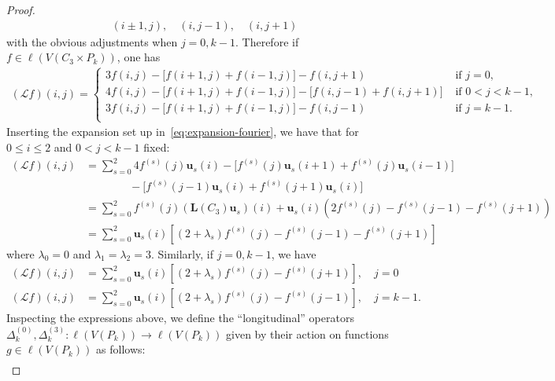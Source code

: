 \documentclass[11pt,a4paper]{amsart}
\begin{document}
\begin{proof}
        \begin{align*}
            (i\pm 1,j),\quad (i,j-1),\quad (i,j+1)
        \end{align*}
    with the obvious adjustments when $j = 0, k-1$. Therefore if $f\in \ell(V(C_3\times P_k))$, one has
        {\footnotesize\begin{align*}
            (\mathcal L f)(i,j)= \begin{cases}
                3f(i,j)-\bigl[f(i+1,j)+f(i-1,j)\bigr] - f(i,j+1) &\text{ if } j = 0,\\
                4f(i,j)-\bigl[f(i+1,j)+f(i-1,j)\bigr] -\bigl[f(i,j-1)+f(i,j+1)\bigr] &\text{ if } 0 < j < k-1,\\
                3f(i,j)-\bigl[f(i+1,j)+f(i-1,j)\bigr] - f(i,j-1) &\text{ if } j = k-1.\\
            \end{cases}
        \end{align*}}
    Inserting the expansion set up in~\cref{eq:expansion-fourier}, we have that for $0\leq i\leq 2$ and $0 < j < k-1$ fixed:
        \begin{align*}
            (\mathcal{L}f)(i, j) &= \sum_{s=0}^2 4f^{(s)}(j)\mathbf{u}_s(i)-\bigl[  f^{(s)}(j)\mathbf{u}_s(i+1) + f^{(s)}(j)\mathbf{u}_s(i-1) \bigr]\\
            &\qquad\qquad-\bigl[ f^{(s)}(j-1)\mathbf{u}_s(i) +f^{(s)}(j+1)\mathbf{u}_s(i)\bigr]\\
            &= \sum_{s=0}^2 f^{(s)}(j)(\mathbf{L}(C_3)\mathbf{u}_s)(i) + \mathbf{u}_s(i)(2f^{(s)}(j) -f^{(s)}(j-1) -f^{(s)}(j+1)) \\
            &=\sum_{s=0}^2 \mathbf{u}_s(i)\left[(2+\lambda_s)f^{(s)}(j) -f^{(s)}(j-1) -f^{(s)}(j+1)\right]
        \end{align*}
    where $\lambda_0 = 0$ and $\lambda_1 = \lambda_2= 3$. Similarly, if $j=0, k-1$, we have
        \begin{align*}
            (\mathcal{L}f)(i, j) &= \sum_{s=0}^2 \mathbf{u}_s(i)\left[(2+\lambda_s)f^{(s)}(j) -f^{(s)}(j+1)\right],\quad j=0\\
            (\mathcal{L}f)(i, j) &= \sum_{s=0}^2 \mathbf{u}_s(i)\left[(2+\lambda_s)f^{(s)}(j) -f^{(s)}(j-1)\right],\quad j=k-1.
        \end{align*}
    Inspecting the expressions above, we define the ``longitudinal'' operators $\Delta_k^{(0)}, \Delta_k^{(3)}:\ell(V(P_k))\rightarrow \ell(V(P_k))$ given by their action on functions $g\in \ell(V(P_k))$ as follows:
        \begin{align*}

\end{align*}
\end{proof}
\end{document}
